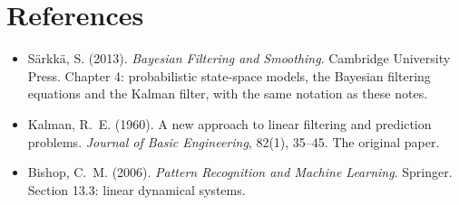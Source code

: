\section*{References}
\begin{itemize}
\item S\"arkk\"a, S. (2013). \emph{Bayesian Filtering and Smoothing}. Cambridge University Press. Chapter 4: probabilistic state-space models, the Bayesian filtering equations and the Kalman filter, with the same notation as these notes.
\item Kalman, R.~E. (1960). A new approach to linear filtering and prediction problems. \emph{Journal of Basic Engineering}, 82(1), 35--45. The original paper.
\item Bishop, C.~M. (2006). \emph{Pattern Recognition and Machine Learning}. Springer. Section 13.3: linear dynamical systems.
\end{itemize}


